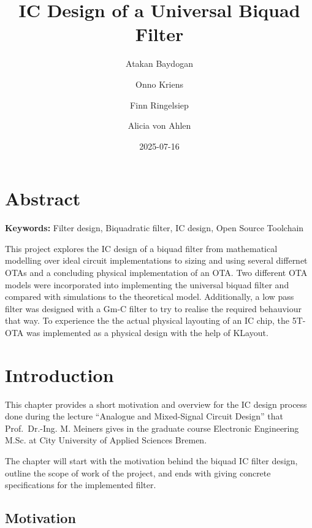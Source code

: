 \documentclass[
  letterpaper,
]{scrbook}
\title{IC Design of a Universal Biquad Filter}
\author{Atakan Baydogan \and Onno Kriens \and Finn
Ringelsiep \and Alicia von Ahlen}
\date{2025-07-16}
\renewcommand*\contentsname{Table of contents}
\newcommand\contentsname{Table of contents}
\begin{document}
\frontmatter
\maketitle

\renewcommand*\contentsname{Table of contents}
{
\hypersetup{linkcolor=}
\setcounter{tocdepth}{2}
\tableofcontents
}

\mainmatter
{}

\chapter*{Abstract}\label{abstract}


\textbf{Keywords:} Filter design, Biquadratic filter, IC design, Open
Source Toolchain

This project explores the IC design of a biquad filter from mathematical
modelling over ideal circuit implementations to sizing and using several
differnet OTAs and a concluding physical implementation of an OTA. Two
different OTA models were incorporated into implementing the universal
biquad filter and compared with simulations to the theoretical model.
Additionally, a low pass filter was designed with a Gm-C filter to try
to realise the required behauviour that way. To experience the the
actual physical layouting of an IC chip, the 5T-OTA was implemented as a
physical design with the help of KLayout.


\chapter{Introduction}\label{introduction}

This chapter provides a short motivation and overview for the IC design
process done during the lecture ``Analogue and Mixed-Signal Circuit
Design'' that Prof.~Dr.-Ing. M. Meiners gives in the graduate course
Electronic Engineering M.Sc. at City University of Applied Sciences
Bremen.

The chapter will start with the motivation behind the biquad IC filter
design, outline the scope of work of the project, and ends with giving
concrete specifications for the implemented filter.

\section{Motivation}\label{motivation}
\end{document}
